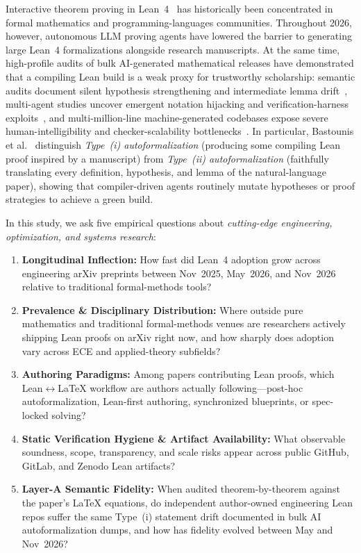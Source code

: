 \documentclass[11pt,letterpaper]{article}
\begin{document}
Interactive theorem proving in Lean~4~\cite{demoura2021lean4} has historically been concentrated in formal mathematics and programming-languages communities. Throughout 2026, however, autonomous LLM proving agents have lowered the barrier to generating large Lean~4 formalizations alongside research manuscripts. At the same time, high-profile audits of bulk AI-generated mathematical releases have demonstrated that a compiling Lean build is a weak proxy for trustworthy scholarship: semantic audits document silent hypothesis strengthening and intermediate lemma drift~\cite{bastounis2026navier,leanatlas2026}, multi-agent studies uncover emergent notation hijacking and verification-harness exploits~\cite{paglieri2026swarms}, and multi-million-line machine-generated codebases expose severe human-intelligibility and checker-scalability bottlenecks~\cite{axle2026}. In particular, Bastounis et al.~\cite{bastounis2026navier} distinguish \emph{Type~(i) autoformalization} (producing some compiling Lean proof inspired by a manuscript) from \emph{Type~(ii) autoformalization} (faithfully translating every definition, hypothesis, and lemma of the natural-language paper), showing that compiler-driven agents routinely mutate hypotheses or proof strategies to achieve a green build.

In this study, we ask five empirical questions about \emph{cutting-edge engineering, optimization, and systems research}:
\begin{enumerate}
  \item \textbf{Longitudinal Inflection:} How fast did Lean~4 adoption grow across engineering arXiv preprints between Nov~2025, May~2026, and Nov~2026 relative to traditional formal-methods tools?
  \item \textbf{Prevalence \& Disciplinary Distribution:} Where outside pure mathematics and traditional formal-methods venues are researchers actively shipping Lean proofs on arXiv right now, and how sharply does adoption vary across ECE and applied-theory subfields?
  \item \textbf{Authoring Paradigms:} Among papers contributing Lean proofs, which Lean$\leftrightarrow$\LaTeX{} workflow are authors actually following---post-hoc autoformalization, Lean-first authoring, synchronized blueprints, or spec-locked solving?
  \item \textbf{Static Verification Hygiene \& Artifact Availability:} What observable soundness, scope, transparency, and scale risks appear across public GitHub, GitLab, and Zenodo Lean artifacts?
  \item \textbf{Layer-A Semantic Fidelity:} When audited theorem-by-theorem against the paper's \LaTeX{} equations, do independent author-owned engineering Lean repos suffer the same Type~(i) statement drift documented in bulk AI autoformalization dumps, and how has fidelity evolved between May and Nov~2026?
\end{enumerate}
\end{document}
